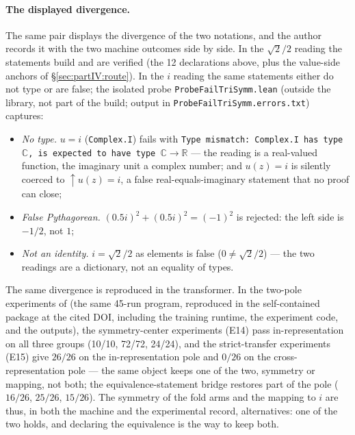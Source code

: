 \documentclass{article}
\begin{document}
\paragraph{The displayed divergence.} The same pair displays the
divergence of the two notations, and the author records it with the
two machine outcomes side by side. In the $\sqrt2/2$ reading the
statements build and are verified (the 12 declarations above, plus
the value-side anchors of \S\ref{sec:partIV:route}). In the $i$ reading
the same statements either do not type or are false; the isolated
probe \texttt{ProbeFailTriSymm.lean} (outside the library, not part
of the build; output in
\texttt{ProbeFailTriSymm.errors.txt}) captures:
\begin{itemize}
\item \emph{No type.} $u=i$ (\texttt{Complex.I}) fails with
  \texttt{Type mismatch: Complex.I has type $\mathbb C$, is expected
  to have type $\mathbb C\to\mathbb R$} --- the reading is a
  real-valued function, the imaginary unit a complex number; and
  $u(z)=i$ is silently coerced to $\uparrow u(z)=i$, a false
  real-equals-imaginary statement that no proof can close;
\item \emph{False Pythagorean.} $(0.5i)^2+(0.5i)^2=(-1)^2$ is
  rejected: the left side is $-1/2$, not $1$;
\item \emph{Not an identity.} $i=\sqrt2/2$ as elements is false
  ($0\neq\sqrt2/2$) --- the two readings are a dictionary, not an
  equality of types.
\end{itemize}

The same divergence is reproduced in the transformer. In the
two-pole experiments of \cite{fourtheorems} (the same 45-run program,
reproduced in the self-contained package at the cited DOI, including
the training runtime, the experiment code, and the outputs), the
symmetry-center experiments (E14) pass in-representation on all three
groups (10/10, 72/72, 24/24), and the strict-transfer experiments
(E15) give $26/26$ on the in-representation pole and $0/26$ on the
cross-representation pole --- the same object keeps one of the two,
symmetry or mapping, not both; the equivalence-statement bridge restores
part of the pole ($16/26$, $25/26$, $15/26$). The symmetry of the fold
arms and the mapping to $i$ are thus, in both the machine and the
experimental record, alternatives: one of the two holds, and declaring
the equivalence is the way to keep both.
\end{document}
